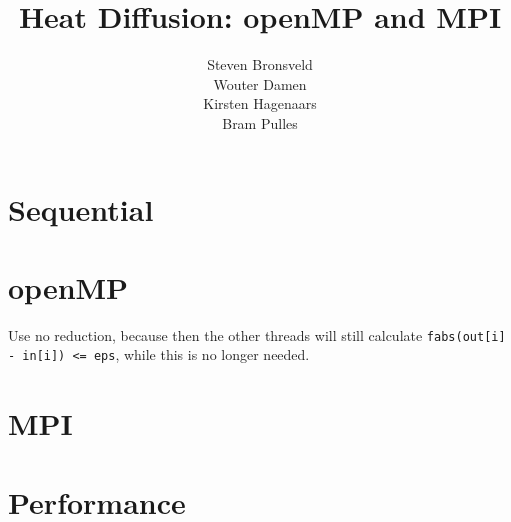 \documentclass[a4paper]{article}
\author{Steven Bronsveld\\Wouter Damen\\Kirsten Hagenaars\\Bram Pulles}
\title{\textbf{Heat Diffusion: openMP and MPI}}
\begin{document}
\maketitle

\tableofcontents

\pagebreak
\section{Sequential}

\section{openMP}
Use no reduction, because then the other threads will still calculate \texttt{fabs(out[i] - in[i]) <= eps}, while this is no longer needed.

\section{MPI}

\section{Performance}
\end{document}
